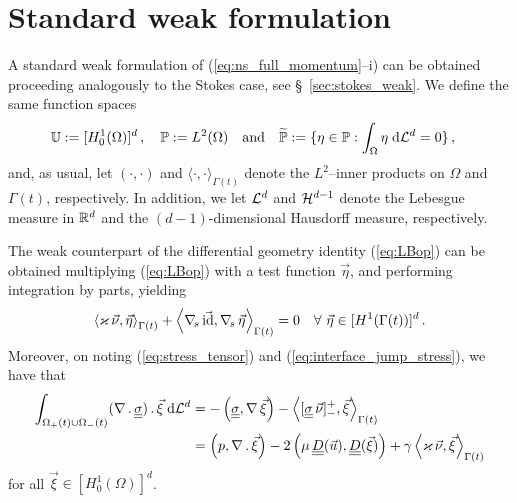 \section{Standard weak formulation}\label{sec:ns_weak}
A standard weak formulation of (\ref{eq:ns_full_momentum}--i) can be obtained
proceeding analogously to the Stokes case, see \S~\ref{sec:stokes_weak}. We
define the same function spaces
\begin{align*}
\mathbb{U} &:= [H^1_0(\Omega)]^d\,,\quad \mathbb{P} := L^2(\Omega) \quad
\mbox{and}\quad
\widetilde{\mathbb{P}} := \{\eta\in\mathbb{P} : \int_\Omega\eta\;{\rm d}{\cal L}^{d}=0 \}\,,
\end{align*}
and, as usual, let $(\cdot,\cdot)$ and $\langle \cdot, \cdot
\rangle_{\Gamma(t)}$ denote the $L^2$--inner products on $\Omega$ and
$\Gamma(t)$, respectively. In addition, we let $\mathcal{L}^d$ and $\mathcal{H}^{d-1}$ denote the
Lebesgue measure in ${\mathbb R}^d$ and the $(d-1)$-dimensional Hausdorff measure,
respectively.

The weak counterpart of the differential geometry identity (\ref{eq:LBop})
can be obtained multiplying (\ref{eq:LBop}) with a test function $\vec\eta$,
and performing integration by parts, yielding
\begin{equation*}
\left\langle \varkappa\,\vec\nu, \vec\eta \right\rangle_{\Gamma(t)}
+ \left\langle \nabla_{\!s}\,\vec {\rm id}, \nabla_{\!s}\,\vec \eta \right\rangle_{\Gamma(t)}
= 0  \quad \forall\ \vec\eta \in [H^1(\Gamma(t))]^d\,.
\end{equation*}
Moreover, on noting (\ref{eq:stress_tensor}) and
(\ref{eq:interface_jump_stress}), we have that
\begin{align*}
\int_{\Omega_+(t)\cup\Omega_-(t)} (\nabla\,.\,\mat\sigma)\,.\, \vec \xi \dL{d}
& = - \left(\mat\sigma, \nabla\,\vec \xi\right)
- \left\langle [\mat\sigma\,\vec\nu]_-^+ , \vec \xi
  \right\rangle_{\Gamma(t)} \nonumber \\
& = \left( p , \nabla\,.\,\vec \xi\right)
-2 \left(\mu\,\mat D(\vec u) , \mat D(\vec \xi) \right)
+ \gamma \left\langle \varkappa\,\vec \nu , \vec \xi  \right\rangle_{\Gamma(t)}
\end{align*}
for all $\vec \xi \in [H^1_0(\Omega)]^d$.

